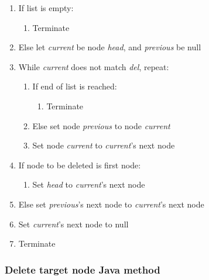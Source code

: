 \begin{enumerate}
\item If list is empty:
	\begin{enumerate}
	\item Terminate
	\end{enumerate}
\item Else let \emph{current} be node \emph{head}, and \emph{previous} be null
\item While \emph{current} does not match \emph{del}, repeat:
	\begin{enumerate}
	\item If end of list is reached:
		\begin{enumerate}
		\item Terminate
		\end{enumerate}
	\item Else set node \emph{previous} to node \emph{current}
	\item Set node \emph{current} to \emph{current}'s next node
	\end{enumerate}
\item If node to be deleted is first node:
	\begin{enumerate}
	\item Set \emph{head} to \emph{current}'s next node
	\end{enumerate}
\item Else set \emph{previous}'s next node to \emph{current}'s next node
\item Set \emph{current}'s next node to null
\item Terminate
\end{enumerate}


\subsubsection{Delete target node Java method}

